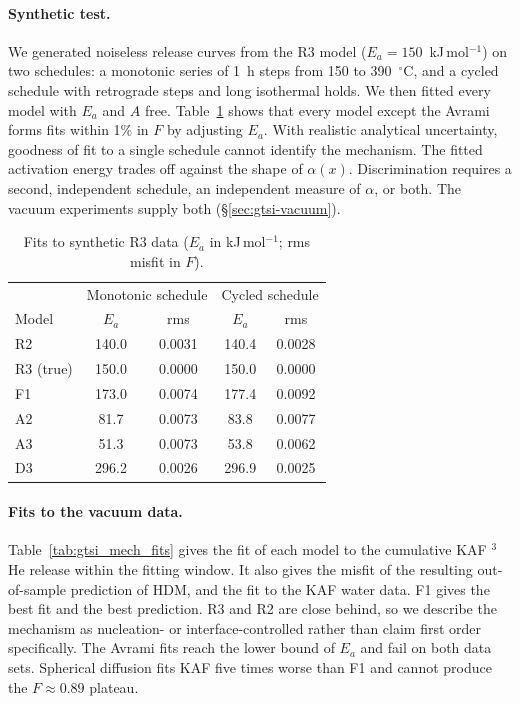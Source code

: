 \paragraph{Synthetic test.} We generated noiseless release curves from the R3 model
($E_a = 150$~kJ\,mol$^{-1}$) on two schedules: a monotonic series of 1~h steps from 150 to
390~$^\circ$C, and a cycled schedule with retrograde steps and long isothermal holds. We then
fitted every model with $E_a$ and $A$ free. Table~\ref{tab:gtsi_synth} shows that every model
except the Avrami forms fits within 1\% in $F$ by adjusting $E_a$. With realistic analytical
uncertainty, goodness of fit to a single schedule cannot identify the mechanism. The fitted
activation energy trades off against the shape of $\alpha(x)$. Discrimination requires a second,
independent schedule, an independent measure of $\alpha$, or both. The vacuum experiments supply
both (\S\ref{sec:gtsi-vacuum}).

\begin{table}[htbp]
  \centering
  \caption{Fits to synthetic R3 data ($E_a$ in kJ\,mol$^{-1}$; rms misfit in $F$).}
  \label{tab:gtsi_synth}
  \begin{tabular}{lcccc}
    \hline
    & \multicolumn{2}{c}{Monotonic schedule} & \multicolumn{2}{c}{Cycled schedule} \\
    Model & $E_a$ & rms & $E_a$ & rms \\
    \hline
    R2 & 140.0 & 0.0031 & 140.4 & 0.0028 \\
    R3 (true) & 150.0 & 0.0000 & 150.0 & 0.0000 \\
    F1 & 173.0 & 0.0074 & 177.4 & 0.0092 \\
    A2 & 81.7 & 0.0073 & 83.8 & 0.0077 \\
    A3 & 51.3 & 0.0073 & 53.8 & 0.0062 \\
    D3 & 296.2 & 0.0026 & 296.9 & 0.0025 \\
    \hline
  \end{tabular}
\end{table}

\paragraph{Fits to the vacuum data.} Table~\ref{tab:gtsi_mech_fits} gives the fit of each model to
the cumulative KAF $^3$He release within the fitting window. It also gives the misfit of the
resulting out-of-sample prediction of HDM, and the fit to the KAF water data. F1 gives the best
fit and the best prediction. R3 and R2 are close behind, so we describe the mechanism as
nucleation- or interface-controlled rather than claim first order specifically. The Avrami
fits reach the lower bound of $E_a$ and fail on both data sets. Spherical diffusion fits KAF
five times worse than F1 and cannot produce the $F\approx0.89$ plateau.

